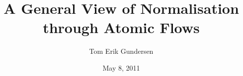 \documentclass[a4paper,11pt]{article}
\author{Tom Erik Gundersen}
\title{A General View of Normalisation through Atomic Flows}
\date{May 8, 2011}
\begin{document}

\maketitle











\small

\end{document}
